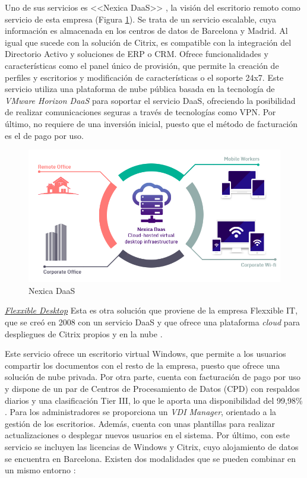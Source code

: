 Uno de sus servicios es <<Nexica \acs{DaaS}>> \cite{nexicadaas}, la visión del escritorio remoto como servicio de esta empresa (Figura \ref{fig:nexica_daas}). Se trata de un servicio escalable, cuya información es almacenada en los centros de datos de Barcelona y Madrid. Al igual que sucede con la solución de Citrix, es compatible con la integración del Directorio Activo y soluciones de \acf{ERP} o \acf{CRM}. Ofrece funcionalidades y características como el panel único de provisión, que permite la creación de perfiles y escritorios y modificación de características o el soporte 24x7. Este servicio utiliza una plataforma de nube pública basada en la tecnología de \textit{VMware Horizon \acs{DaaS}} para soportar el servicio \acs{DaaS}, ofreciendo la posibilidad de realizar comunicaciones seguras a través de tecnologías como \acs{VPN}. Por último, no requiere de una inversión inicial, puesto que el método de facturación es el de pago por uso.

\begin{figure}[h]
    \centering
    \includegraphics[width=0.8\linewidth]{figures/images/nexica_daas.png}
    \caption{Nexica \acs{DaaS}}
    \label{fig:nexica_daas}
\end{figure}

\clearpage

\noindent\underline{\textit{Flexxible Desktop}}\newline
\indent Esta es otra solución que proviene de la empresa Flexxible IT, que se creó en 2008 con un servicio \acs{DaaS} y que ofrece una plataforma \textit{cloud} para despliegues de Citrix propios y en la nube \cite{flexxibleitabout}.

Este servicio ofrece un escritorio virtual Windows, que permite a los usuarios compartir los documentos con el resto de la empresa, puesto que ofrece una solución de nube privada. Por otra parte, cuenta con facturación de pago por uso y dispone de un par de Centros de Procesamiento de Datos (\acs{CPD}) con respaldos diarios y una clasificación Tier III, lo que le aporta una disponibilidad del 99,98\% \cite{flexxiblebeneficios}. Para los administradores se proporciona un \textit{VDI Manager}, orientado a la gestión de los escritorios. Además, cuenta con unas plantillas para realizar actualizaciones o desplegar nuevos usuarios en el sistema. Por último, con este servicio se incluyen las licencias de Windows y Citrix, cuyo alojamiento de datos se encuentra en Barcelona. Existen dos modalidades que se pueden combinar en un mismo entorno \cite{flexxiblequeincluye}: 

